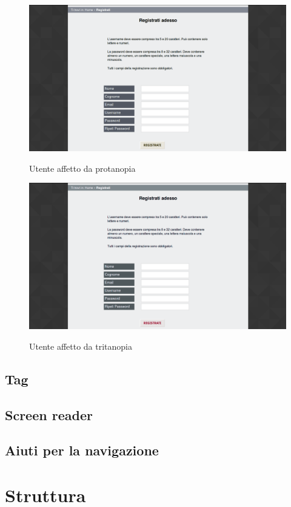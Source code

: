 	\begin{figure}
	\includegraphics[scale=0.3]{images/protanopia2.jpg}\\[1cm] \caption{Utente affetto da protanopia} \end{figure}
	\begin{figure}
	\includegraphics[scale=0.3]{images/tritanopia2.jpg}\\[1cm] \caption{Utente affetto da tritanopia} \end{figure}
	\subsection{Tag}
	\subsection{Screen reader}
	\subsection{Aiuti per la navigazione}
	\section{Struttura}
